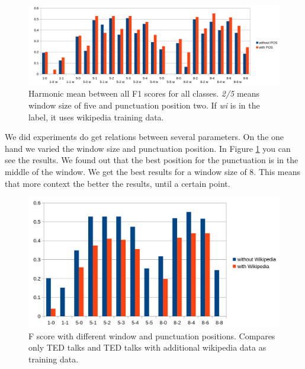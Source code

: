 \begin{figure}[ht]
    \centering
    \includegraphics[width=\textwidth]{img/window_eval.png}
    \caption{Harmonic mean between all F1 scores for all classes. \emph{2/5} means window size of five and punctuation position two. If \emph{wi} is in the label, it uses wikipedia training data.}
    \label{fig:window_eval}
\end{figure}

We did experiments do get relations between several parameters.
On the one hand we varied the window size and punctuation position.
In Figure \ref{fig:window_eval} you can see the results.
We found out that the best position for the punctuation is in the middle of the window.
We get the best results for a window size of 8.
This means that more context the better the results, until a certain point.

\begin{figure}[ht]
    \centering
    \includegraphics[width=\textwidth]{img/window_wiki_eval.png}
    \caption{F score with different window and punctuation positions. Compares only TED talks and TED talks with additional wikipedia data as training data.}
    \label{fig:window_wiki_eval}
\end{figure}


